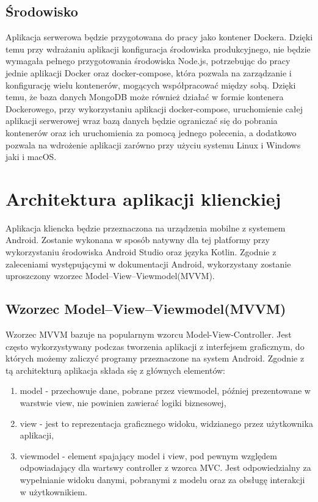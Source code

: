 \documentclass[a4paper,12pt,twoside,openany]{report}
\begin{document}
\subsection{Środowisko}
Aplikacja serwerowa będzie przygotowana do pracy jako kontener Dockera. Dzięki temu przy wdrażaniu aplikacji konfiguracja środowiska produkcyjnego, nie będzie wymagała pełnego przygotowania środowiska Node.js, potrzebując do pracy jednie aplikacji Docker oraz docker-compose, która pozwala na zarządzanie i konfigurację wielu kontenerów, mogących współpracować między sobą. Dzięki temu, że baza danych MongoDB może również działać w formie kontenera Dockerowego, przy wykorzystaniu aplikacji docker-compose, uruchomienie całej aplikacji serwerowej wraz bazą danych będzie ograniczać się do pobrania kontenerów oraz ich uruchomienia za pomocą jednego polecenia, a dodatkowo pozwala na wdrożenie aplikacji zarówno przy użyciu systemu Linux i Windows jaki i macOS.

\section{Architektura aplikacji klienckiej}
Aplikacja kliencka będzie przeznaczona na urządzenia mobilne z systemem Android. Zostanie wykonana w sposób natywny dla tej platformy przy wykorzystaniu środowiska Android Studio oraz języka Kotlin. Zgodnie z zaleceniami występującymi w dokumentacji Android, wykorzystany zostanie uproszczony wzorzec Model–View–Viewmodel(MVVM). 

\subsection{Wzorzec Model–View–Viewmodel(MVVM)}
Wzorzec MVVM bazuje na popularnym wzorcu Model-View-Controller. Jest często wykorzystywany podczas tworzenia aplikacji z interfejsem graficznym, do których możemy zaliczyć programy przeznaczone na system Android. 
Zgodnie z tą architekturą aplikacja składa się z głównych elementów:
\begin{enumerate}
	\item model - przechowuje dane, pobrane przez viewmodel, później prezentowane w warstwie view, nie powinien zawierać logiki biznesowej,
	\item view - jest to reprezentacja graficznego widoku, widzianego przez użytkownika aplikacji,
	\item viewmodel - element spajający model i view, pod pewnym względem odpowiadający dla wartswy controller z wzorca MVC. Jest odpowiedzialny za wypełnianie widoku danymi, pobranymi z modelu oraz za obsługę interakcji w użytkownikiem. 
\end{enumerate}
\end{document}
